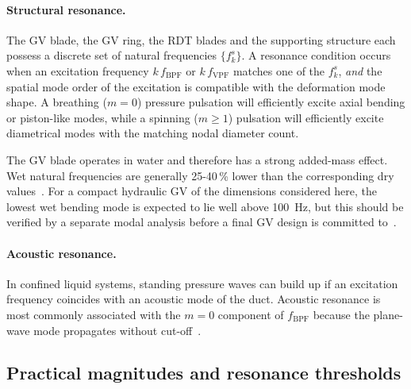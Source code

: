 \paragraph{Structural resonance.} The GV blade, the GV ring, the RDT blades and the supporting structure each possess a discrete set of natural frequencies $\{f_k^s\}$. A resonance condition occurs when an excitation frequency $k\,f_{\mathrm{BPF}}$ or $k\,f_{\mathrm{VPF}}$ matches one of the $f_k^s$, \emph{and} the spatial mode order of the excitation is compatible with the deformation mode shape. A breathing ($m=0$) pressure pulsation will efficiently excite axial bending or piston-like modes, while a spinning ($m\geq 1$) pulsation will efficiently excite diametrical modes with the matching nodal diameter count.
 
The GV blade operates in water and therefore has a strong added-mass effect. Wet natural frequencies are generally 25-40\,\% lower than the corresponding dry values~\cite{Tanaka2011}. For a compact hydraulic GV of the dimensions considered here, the lowest wet bending mode is expected to lie well above 100~Hz, but this should be verified by a separate modal analysis before a final GV design is committed to~\cite{Valentin2015}.
 
\paragraph{Acoustic resonance.} In confined liquid systems, standing pressure waves can build up if an excitation frequency coincides with an acoustic mode of the duct. Acoustic resonance is most commonly associated with the $m=0$ component of $f_{\mathrm{BPF}}$ because the plane-wave mode propagates without cut-off~\cite{Nicolet2007}.
 
\subsection{Practical magnitudes and resonance thresholds}
\label{sec:rsi-magnitudes}
 

